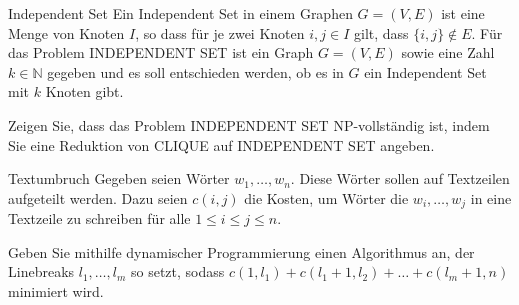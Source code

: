 \documentclass{exercisesheet}
\begin{document}
\newpage\setcounter{section}{6}\setcounter{subsection}{0}
\begin{exercise}{Independent Set}
  Ein Independent Set in einem Graphen $G = (V, E)$ ist eine Menge von Knoten $I$, so dass für je zwei Knoten $i, j \in I$ gilt, dass $\{i, j\} \notin E$. Für das Problem INDEPENDENT SET ist ein Graph $G = (V, E)$ sowie eine Zahl $k \in \mathbb{N}$ gegeben und es soll entschieden werden, ob es in $G$ ein Independent Set mit $k$ Knoten gibt.\par
  Zeigen Sie, dass das Problem INDEPENDENT SET NP-vollständig ist, indem Sie eine Reduktion von CLIQUE auf INDEPENDENT SET angeben.
\end{exercise}

\begin{exercise}{Textumbruch}
  Gegeben seien Wörter $w_1, \ldots, w_n$. Diese Wörter sollen auf Textzeilen aufgeteilt werden. Dazu seien $c(i, j)$ die Kosten, um Wörter die $w_i, \ldots, w_j$ in eine Textzeile zu schreiben für alle $1 \leq i \leq j \leq n$.\par
  Geben Sie mithilfe dynamischer Programmierung einen Algorithmus an, der Linebreaks $l_1, \ldots, l_m$ so setzt, sodass $c(1,l_1)+c(l_1 +1,l_2)+\ldots+c(l_m +1,n)$ minimiert wird.
\end{exercise}

\setcounter{section}{0}

\end{document}
